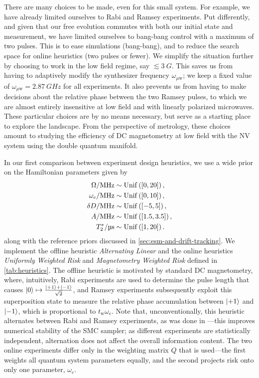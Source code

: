 \documentclass[aps,nofootinbib,twocolumn,superscriptaddress]{revtex4}
\newcommand{\tw}{t_\text{w}}
\newcommand{\uw}{{\mu\text{w}}}
\begin{document}
There are many choices to be made, even for this small system.
For example, we have already limited ourselves to Rabi and
Ramsey experiments.
Put differently, and given that our free evolution commutes with
both our initial state and measurement,
we have limited ourselves to bang-bang control
with a maximum of two pulses.
This is to ease simulations (bang-bang), and to reduce the
search space for online heuristics (two pulses or fewer).
We simplify the situation further by choosing to work in the low field
regime, say $\lesssim\SI{3}{G}$.
This saves us from having to adaptively modify the synthesizer
frequency $\omega_\uw$; we keep a fixed value of
$\omega_\uw=\SI{2.87}{GHz}$ for all experiments.
It also
prevents us from having to make decisions about the relative
phase between the two Ramsey pulses, to which we are
almost entirely insensitive at low field and with linearly
polarized microwaves.
These particular choices are by no means necessary, but serve
as a starting place to explore the landscape.
From the perspective of metrology, these choices amount to studying
the efficiency of DC magnetometry at low field with the NV system using
the double quantum manifold.

In our first comparison between experiment design heuristics,
we use a wide prior on the Hamiltonian
parameters given by
\begin{subequations}
\begin{align}
    \Omega/\si{MHz}
        &\sim \uniformdist\left( [0, 20] \right), \\
    \omega_e/\si{MHz}
        &\sim \uniformdist\left( [0, 10] \right), \\
    \delta D/\si{MHz}
        &\sim \uniformdist\left( [-5, 5] \right), \\
    A/\si{MHz}
        &\sim \uniformdist\left( [1.5, 3.5] \right), \\
    T_2^*/\si{\micro\second}
        &\sim \uniformdist\left( [1, 20] \right).
\end{align}
\label{eq:wide-prior}%
\end{subequations}
along with the reference priors discussed in
\autoref{sec:esm-and-drift-tracking}.
We implement the offline heuristic \textit{Alternating Linear} and the
online heuristics \textit{Uniformly Weighted Risk} and
\textit{Magnetometry Weighted Risk}
defined in \autoref{tab:heuristics}.
The offline heuristic is motivated by standard DC magnetometry,
where, intuitively, Rabi experiments are used to determine the pulse length
that causes $\ket{0}\mapsto\frac{\ket{+1}+\ket{-1}}{\sqrt{2}}$,
and Ramsey experiments subsequently exploit  this superposition state
to measure the relative
phase accumulation between $\ket{+1}$ and $\ket{-1}$, which is
proportional to $\tw \omega_e$.
Note that, unconventionally, this heuristic alternates between
Rabi and Ramsey experiments, as was done in \cite{hincks_statistical_2018}---this improves
numerical stability of the SMC sampler; as different
experiments are statistically independent, alternation
does not affect the overall information content.
The two online experiments differ only in the weighting matrix $Q$ that is used---the
first weights all quantum system parameters equally, and the second projects risk
onto only one parameter, $\omega_e$.
\end{document}
